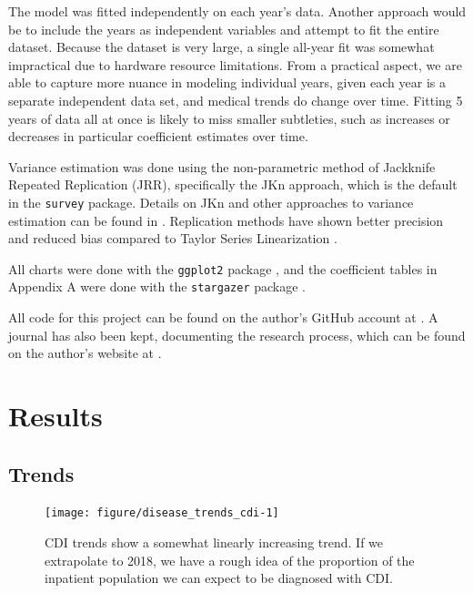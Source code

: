 \documentclass[12pt]{ociamthesis}\usepackage[]{graphicx}\usepackage[]{color}
\newenvironment{knitrout}{}{} %
\begin{document}
The model was fitted independently on each year's data. 
Another approach would be to include the years as independent variables and attempt to fit the entire dataset. Because the dataset is very large,
a single all-year fit was somewhat impractical due to hardware resource limitations. From a practical aspect, we are able to capture more nuance in modeling individual
years, given each year is a separate independent data set, and medical trends do change over time. Fitting 5 years of data all at once is likely to miss smaller subtleties, 
such as increases or decreases in particular coefficient estimates over time. 

Variance estimation was done using the non-parametric method of Jackknife Repeated Replication (JRR), 
specifically the JKn approach, which is the default in the \texttt{survey} package. Details on JKn and other approaches
to variance estimation can be found in \cite{Heeringa2017}.
Replication methods have shown better precision and reduced bias compared to Taylor Series Linearization \cite{Chowdhury2013, Smith2000}. 

All charts were done with the \texttt{ggplot2} package \cite{Wickham2016}, and the coefficient tables in Appendix A were done with the \texttt{stargazer} package \cite{Hlavac2018}. 

All code for this project can be found on the author's GitHub account at \cite{Detweiler2018}. A journal has also been kept, documenting the research process, which can
be found on the author's website at \cite{DetweilerWebsite2018}.

\chapter{Results}


\section{Trends}

\begin{knitrout}
\color{fgcolor}\begin{figure}

{\centering \texttt{[image: figure/disease\_trends\_cdi-1]} 

}

\caption[CDI trends show a somewhat linearly increasing trend]{CDI trends show a somewhat linearly increasing trend. If we extrapolate to 2018, we have a rough idea of the proportion of the inpatient population we can expect to be diagnosed with CDI.}\label{fig:disease_trends_cdi}
\end{figure}


\end{knitrout}
\label{fig:disease_trends_cdi}
\end{document}
